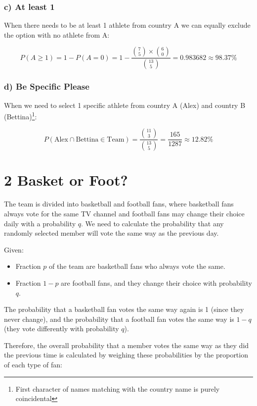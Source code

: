 \documentclass[
]{article}
\begin{document}
\subsubsection{c) At least 1}\label{c-at-least-1}

When there needs to be at least 1 athlete from country A we can equally
exclude the option with no athlete from A:

\[
P(A \geq 1) = 1 - P(A = 0) = 1- \frac{\binom{7}{5} \times \binom{6}{0}}{\binom{13}{5}} = 0.983682 \approx 98.37\%
\]

\subsubsection{d) Be Specific Please}\label{d-be-specific-please}

When we need to select 1 specific athlete from country A (Alex) and
country B
(Bettina)\footnote{First character of names matching with the country name is purely coincidental}:

\[
P(\text{Alex} \cap \text{Bettina} \in \text{Team}) =\frac{\binom{11}{3}}{\binom{13}{5}} = \frac{165}{1287} \approx 12.82\%
\]

\section{2 Basket or Foot?}\label{basket-or-foot}

The team is divided into basketball and football fans, where basketball
fans always vote for the same TV channel and football fans may change
their choice daily with a probability \(q\). We need to calculate the
probability that any randomly selected member will vote the same way as
the previous day.

Given:

\begin{itemize}
    \item Fraction \( p \) of the team are basketball fans who always vote the same.
    \item Fraction \( 1-p \) are football fans, and they change their choice with probability \( q \).
\end{itemize}

The probability that a basketball fan votes the same way again is 1
(since they never change), and the probability that a football fan votes
the same way is \(1-q\) (they vote differently with probability \(q\)).

Therefore, the overall probability that a member votes the same way as
they did the previous time is calculated by weighing these probabilities
by the proportion of each type of fan:
\end{document}
